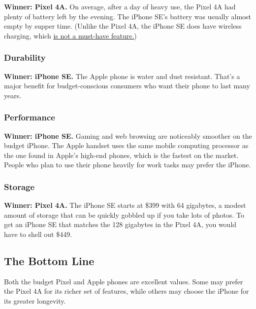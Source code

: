 \textbf{Winner: Pixel 4A.} On average, after a day of heavy use, the
Pixel 4A had plenty of battery left by the evening. The iPhone SE's
battery was usually almost empty by supper time. (Unlike the Pixel 4A,
the iPhone SE does have wireless charging, which
\href{https://www.nytimes3xbfgragh.onion/2018/10/03/technology/personaltech/wireless-charging-pros-cons.html}{is
not a must-have feature.})

\hypertarget{durability}{%
\subsubsection{Durability}\label{durability}}

\textbf{Winner: iPhone SE.} The Apple phone is water and dust resistant.
That's a major benefit for budget-conscious consumers who want their
phone to last many years.

\hypertarget{performance}{%
\subsubsection{Performance}\label{performance}}

\textbf{Winner: iPhone SE.} Gaming and web browsing are noticeably
smoother on the budget iPhone. The Apple handset uses the same mobile
computing processor as the one found in Apple's high-end phones, which
is the fastest on the market. People who plan to use their phone heavily
for work tasks may prefer the iPhone.

\hypertarget{storage}{%
\subsubsection{Storage}\label{storage}}

\textbf{Winner: Pixel 4A.} The iPhone SE starts at \$399 with 64
gigabytes, a modest amount of storage that can be quickly gobbled up if
you take lots of photos. To get an iPhone SE that matches the 128
gigabytes in the Pixel 4A, you would have to shell out \$449.

\hypertarget{the-bottom-line}{%
\subsection{The Bottom Line}\label{the-bottom-line}}

Both the budget Pixel and Apple phones are excellent values. Some may
prefer the Pixel 4A for its richer set of features, while others may
choose the iPhone for its greater longevity.

